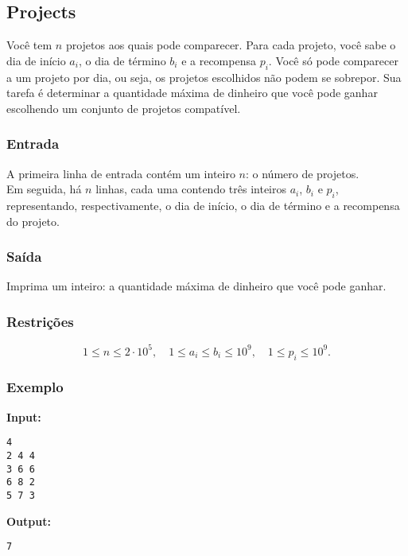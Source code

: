 \subsection{Projects}
Você tem \( n \) projetos aos quais pode comparecer. Para cada projeto, você sabe o dia de início \( a_i \), o dia de término \( b_i \) e a recompensa \( p_i \). Você só pode comparecer a um projeto por dia, ou seja, os projetos escolhidos não podem se sobrepor. Sua tarefa é determinar a quantidade máxima de dinheiro que você pode ganhar escolhendo um conjunto de projetos compatível.

\subsubsection*{Entrada}
A primeira linha de entrada contém um inteiro \( n \): o número de projetos.\\
Em seguida, há \( n \) linhas, cada uma contendo três inteiros \( a_i \), \( b_i \) e \( p_i \), representando, respectivamente, o dia de início, o dia de término e a recompensa do projeto.

\subsubsection*{Saída}
Imprima um inteiro: a quantidade máxima de dinheiro que você pode ganhar.

\subsubsection*{Restrições}
\[
1 \le n \le 2 \cdot 10^5,\quad 1 \le a_i \le b_i \le 10^9,\quad 1 \le p_i \le 10^9.
\]

\subsubsection*{Exemplo}

\textbf{Input:}
\begin{verbatim}
4
2 4 4
3 6 6
6 8 2
5 7 3
\end{verbatim}

\textbf{Output:}
\begin{verbatim}
7
\end{verbatim}

